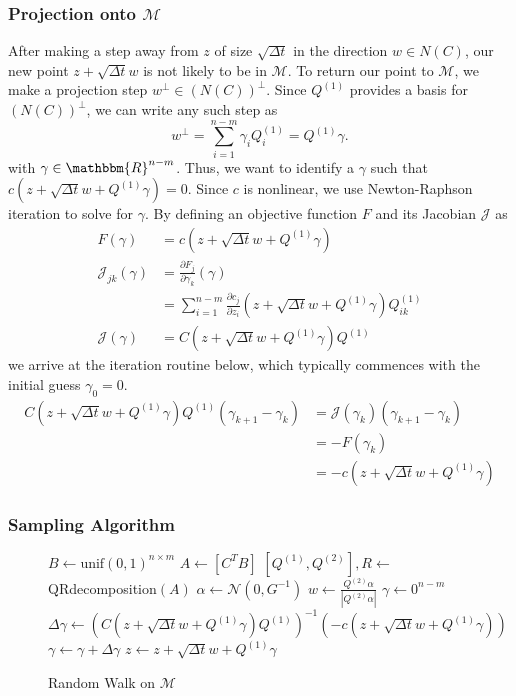 \subsubsection{Projection onto $\mathcal{M}$}
After making a step away from $z$ of size $\sqrt{\Delta t}$ in the direction $w \in N(C)$, our new point $z + \sqrt{\Delta t}w$ is not likely to be in $\mathcal{M}$. To return our point to $\mathcal{M}$, we make a projection step $w^\perp \in (N(C))^\perp$. Since $Q^{(1)}$ provides a basis for $(N(C))^\perp$, we can write any such step as 
$$w^\perp = \sum_{i=1}^{n-m} \gamma_iQ^{(1)}_i = Q^{(1)}\gamma.$$
with $\gamma \in \mathbbm{R}^{n-m}$. Thus, we want to identify a $\gamma$ such that $c(z + \sqrt{\Delta t} w + Q^{(1)}\gamma) = 0$. Since $c$ is nonlinear, we use Newton-Raphson iteration to solve for $\gamma$. By defining an objective function $F$ and its Jacobian $\mathcal{J}$ as
\begin{align}
        F(\gamma) &= c(z + \sqrt{\Delta t} w + Q^{(1)}\gamma) \\
        \mathcal{J}_{jk}(\gamma) &= \frac{\partial F_j}{\partial \gamma_k}(\gamma) \\
        &= \sum_{i=1}^{n-m} \frac{\partial c_j}{\partial z_i}(z + \sqrt{\Delta t} w + Q^{(1)}\gamma)Q^{(1)}_{ik} \\
        \mathcal{J}(\gamma) &= C(z + \sqrt{\Delta t} w + Q^{(1)}\gamma)Q^{(1)}
\end{align}
we arrive at the iteration routine below, which typically commences with the initial guess $\gamma_0 = 0$.
\begin{align}
        C(z + \sqrt{\Delta t} w + Q^{(1)}\gamma)Q^{(1)}\left(\gamma_{k+1} - \gamma_{k}\right) &= \mathcal{J}(\gamma_k)\left(\gamma_{k+1} - \gamma_{k}\right)\\
         &= -F(\gamma_k) \\
         &= -c(z + \sqrt{\Delta t} w + Q^{(1)}\gamma)
\end{align}

\subsubsection{Sampling Algorithm}

\begin{figure}[ht]
\centering
\begin{algorithmic}
        \State $B \gets \text{unif}(0,1)^{n\times m}$       
        \State $A \gets \left[C^T B\right]$
        \State $[Q^{(1)}, Q^{(2)}], R \gets$QRdecomposition$(A)$
        \State $\alpha \gets \mathcal{N}(0,G^{-1})$
        \State $w \gets \frac{Q^{(2)}\alpha}{|Q^{(2)}\alpha|}$
        \State $\gamma \gets 0^{n-m}$
                     \State $\Delta\gamma \gets (C(z + \sqrt{\Delta t} w + Q^{(1)}\gamma)Q^{(1)})^{-1}(-c(z + \sqrt{\Delta t} w + Q^{(1)}\gamma))$
                     \State $\gamma \gets \gamma + \Delta\gamma$
        \EndWhile   
        \State $z \gets z + \sqrt{\Delta t}w + Q^{(1)}\gamma$
\EndFor
\end{algorithmic}
\caption{Random Walk on $\mathcal{M}$}
\label{alg:MBMRW}
\end{figure}



